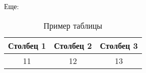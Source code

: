Еще:
\begin{table}[H] %
    \begin{center} %
		\caption[Заголовок]{Пример таблицы}\label{tab:mytab1}
		\begin{tabular}{|c|c|c|} %
		\hline Столбец 1 &  Столбец 2  & Столбец 3 \\ 
		\hline 11 &  12 & 13 \\ 
		\hline 
		\end{tabular}
	\end{center}
\end{table}

\clearpage
